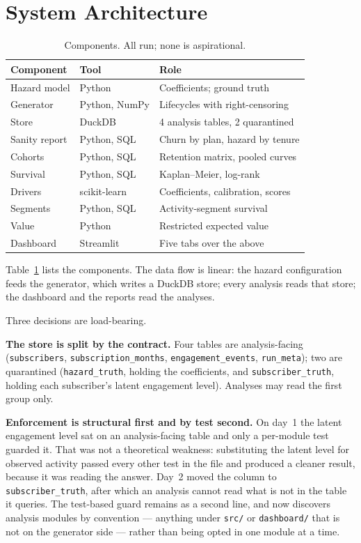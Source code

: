 \documentclass[conference]{IEEEtran}
\begin{document}
\section{System Architecture}

\begin{table}[t]
\caption{Components. All run; none is aspirational.}
\label{tab:components}
\centering
\begin{tabular}{@{}lll@{}}
\toprule
Component & Tool & Role \\
\midrule
Hazard model & Python & Coefficients; ground truth \\
Generator & Python, NumPy & Lifecycles with right-censoring \\
Store & DuckDB & 4 analysis tables, 2 quarantined \\
Sanity report & Python, SQL & Churn by plan, hazard by tenure \\
Cohorts & Python, SQL & Retention matrix, pooled curves \\
Survival & Python, SQL & Kaplan--Meier, log-rank \\
Drivers & scikit-learn & Coefficients, calibration, scores \\
Segments & Python, SQL & Activity-segment survival \\
Value & Python & Restricted expected value \\
Dashboard & Streamlit & Five tabs over the above \\
\bottomrule
\end{tabular}
\end{table}

Table~\ref{tab:components} lists the components. The data flow is linear: the
hazard configuration feeds the generator, which writes a DuckDB store; every
analysis reads that store; the dashboard and the reports read the analyses.

Three decisions are load-bearing.

\textbf{The store is split by the contract.} Four tables are analysis-facing
(\texttt{subscribers}, \texttt{subscription\_months},
\texttt{engagement\_events}, \texttt{run\_meta}); two are quarantined
(\texttt{hazard\_truth}, holding the coefficients, and
\texttt{subscriber\_truth}, holding each subscriber's latent engagement level).
Analyses may read the first group only.

\textbf{Enforcement is structural first and by test second.} On day~1 the
latent engagement level sat on an analysis-facing table and only a per-module
test guarded it. That was not a theoretical weakness: substituting the latent
level for observed activity passed every other test in the file and produced a
cleaner result, because it was reading the answer. Day~2 moved the column to
\texttt{subscriber\_truth}, after which an analysis cannot read what is not in
the table it queries. The test-based guard remains as a second line, and now
discovers analysis modules by convention --- anything under \texttt{src/} or
\texttt{dashboard/} that is not on the generator side --- rather than being
opted in one module at a time.
\end{document}
